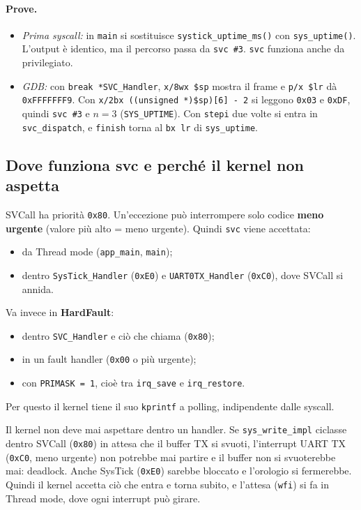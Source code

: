 \paragraph*{Prove.}
\begin{itemize}
    \item \textit{Prima syscall:} in \texttt{main} si sostituisce \texttt{systick\_uptime\_ms()} con \texttt{sys\_uptime()}. L'output è identico, ma il percorso passa da \texttt{svc \#3}. \texttt{svc} funziona anche da privilegiato.
    \item \textit{GDB:} con \texttt{break *SVC\_Handler}, \texttt{x/8wx \$sp} mostra il frame e \texttt{p/x \$lr} dà \texttt{0xFFFFFFF9}. Con \texttt{x/2bx ((unsigned *)\$sp)[6] - 2} si leggono \texttt{0x03} e \texttt{0xDF}, quindi \texttt{svc \#3} e $n = 3$ (\texttt{SYS\_UPTIME}). Con \texttt{stepi} due volte si entra in \texttt{svc\_dispatch}, e \texttt{finish} torna al \texttt{bx lr} di \texttt{sys\_uptime}.
\end{itemize}
 
\subsection*{Dove funziona svc e perché il kernel non aspetta}
SVCall ha priorità \texttt{0x80}. Un'eccezione può interrompere solo codice \textbf{meno urgente} (valore più alto = meno urgente). Quindi \texttt{svc} viene accettata:
\begin{itemize}
    \item da Thread mode (\texttt{app\_main}, \texttt{main});
    \item dentro \texttt{SysTick\_Handler} (\texttt{0xE0}) e \texttt{UART0TX\_Handler} (\texttt{0xC0}), dove SVCall si annida.
\end{itemize}
 
Va invece in \textbf{HardFault}:
\begin{itemize}
    \item dentro \texttt{SVC\_Handler} e ciò che chiama (\texttt{0x80});
    \item in un fault handler (\texttt{0x00} o più urgente);
    \item con \texttt{PRIMASK = 1}, cioè tra \texttt{irq\_save} e \texttt{irq\_restore}.
\end{itemize}
 
Per questo il kernel tiene il suo \texttt{kprintf} a polling, indipendente dalle syscall.
 
Il kernel non deve mai aspettare dentro un handler. Se \texttt{sys\_write\_impl} ciclasse dentro SVCall (\texttt{0x80}) in attesa che il buffer TX si svuoti, l'interrupt UART TX (\texttt{0xC0}, meno urgente) non potrebbe mai partire e il buffer non si svuoterebbe mai: deadlock. Anche SysTick (\texttt{0xE0}) sarebbe bloccato e l'orologio si fermerebbe. Quindi il kernel accetta ciò che entra e torna subito, e l'attesa (\texttt{wfi}) si fa in Thread mode, dove ogni interrupt può girare.
 
